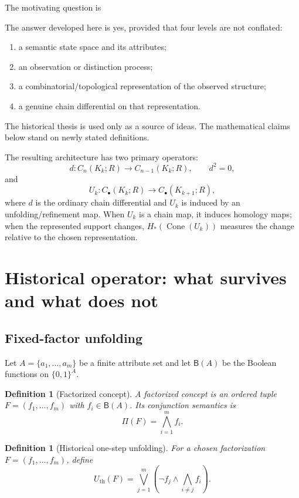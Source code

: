 \documentclass[11pt]{article}
\newtheorem{definition}[theorem]{Definition}
\newcommand{\Cone}{\operatorname{Cone}}
\begin{document}
The motivating question is
\begin{center}
\end{center}
The answer developed here is yes, provided that four levels are not conflated:
\begin{enumerate}[label=(\roman*)]
\item a semantic state space and its attributes;
\item an observation or distinction process;
\item a combinatorial/topological representation of the observed structure;
\item a genuine chain differential on that representation.
\end{enumerate}
The historical thesis is used only as a source of ideas.  The mathematical claims below stand on newly stated definitions.

The resulting architecture has two primary operators:
\[
 d:C_n(K_k;R)\longrightarrow C_{n-1}(K_k;R),\qquad d^2=0,
\]
and
\[
 U_k:C_\bullet(K_k;R)\longrightarrow C_\bullet(K_{k+1};R),
\]
where $d$ is the ordinary chain differential and $U_k$ is induced by an unfolding/refinement map.  When $U_k$ is a chain map, it induces homology maps; when the represented support changes, $H_*(\Cone(U_k))$ measures the change relative to the chosen representation.

\section{Historical operator: what survives and what does not}

\subsection{Fixed-factor unfolding}

Let $A=\{a_1,\dots,a_m\}$ be a finite attribute set and let $\mathsf B(A)$ be the Boolean functions on $\{0,1\}^A$.

\begin{definition}[Factorized concept]
A factorized concept is an ordered tuple $F=(f_1,\dots,f_m)$ with $f_i\in\mathsf B(A)$.  Its conjunction semantics is
\[
\Pi(F)=\bigwedge_{i=1}^m f_i.
\]
\end{definition}

\begin{definition}[Historical one-step unfolding]
For a chosen factorization $F=(f_1,\dots,f_m)$, define
\[
U_{\mathrm{th}}(F)
=\bigvee_{j=1}^m\left(\neg f_j\wedge\bigwedge_{i\neq j}f_i\right).
\]
\end{definition}
\end{document}
